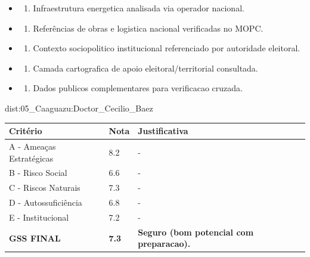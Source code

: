 {\begin{itemize}
\item
  \begin{enumerate}
  \def\labelenumi{\arabic{enumi})}
  \setcounter{enumi}{7}
  \tightlist
  \item
    Infraestrutura energetica analisada via operador nacional.
  \end{enumerate}
\item
  \begin{enumerate}
  \def\labelenumi{\arabic{enumi})}
  \setcounter{enumi}{8}
  \tightlist
  \item
    Referências de obras e logistica nacional verificadas no MOPC.
  \end{enumerate}
\item
  \begin{enumerate}
  \def\labelenumi{\arabic{enumi})}
  \setcounter{enumi}{9}
  \tightlist
  \item
    Contexto sociopolitico institucional referenciado por autoridade
    eleitoral.
  \end{enumerate}
\item
  \begin{enumerate}
  \def\labelenumi{\arabic{enumi})}
  \setcounter{enumi}{10}
  \tightlist
  \item
    Camada cartografica de apoio eleitoral/\allowbreak territorial consultada.
  \end{enumerate}
\item
  \begin{enumerate}
  \def\labelenumi{\arabic{enumi})}
  \setcounter{enumi}{11}
  \tightlist
  \item
    Dados publicos complementares para verificacao cruzada.
  \end{enumerate}
\end{itemize}}{dist:05_Caaguazu:Doctor_Cecilio_Baez}
\begin{table}[ht!]
\small \begin{tabular}{p{3.0cm}p{0.8cm}p{6.0cm}} \toprule
\textbf{Critério} & \textbf{Nota} & \textbf{Justificativa} \\ \midrule
A - Ameaças Estratégicas & 8.2 & - \\
B - Risco Social & 6.6 & - \\
C - Riscos Naturais & 7.3 & - \\
D - Autossuficiência & 6.8 & - \\
E - Institucional & 7.2 & - \\
\midrule \textbf{GSS FINAL} & \textbf{7.3} & \textbf{Seguro (bom potencial com preparacao).} \\ \bottomrule \end{tabular}
\end{table}
